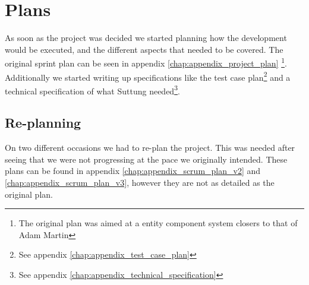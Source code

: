 \section{Plans}
As soon as the project was decided we started planning how the development would
be executed, and the different aspects that needed to be covered.
The original sprint plan can be seen in appendix \ref{chap:appendix_project_plan}
\footnote{The original plan was aimed at a entity component system closers to that of Adam Martin\protect\cite{t_machine_entity_systems}}.
Additionally we started writing up specifications like the test case plan\footnote{See appendix \ref{chap:appendix_test_case_plan}}
and a technical specification of what Suttung needed\footnote{See appendix \ref{chap:appendix_technical_specification}}.

\subsection{Re-planning}
On two different occasions we had to re-plan the project.
This was needed after seeing that we were not progressing at the pace we originally
intended.
These plans can be found in appendix \ref{chap:appendix_scrum_plan_v2} and \ref{chap:appendix_scrum_plan_v3}, however they are not as
detailed as the original plan.
